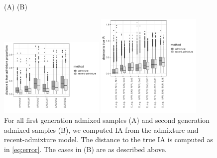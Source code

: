 \documentclass[12pt]{article}
\theoremstyle{definition}
\begin{document}
\begin{figure}[htb]
  \hspace{3cm} (A) \hspace{8cm} (B)
  \begin{center}
    \parbox[b]{0.45\textwidth}{\includegraphics[width=0.45\textwidth]{deviations_mixed.pdf}\vspace{2cm}}
    \hspace{1cm}
    \parbox[b]{0.45\textwidth}{\includegraphics[width=0.45\textwidth]{deviations_mixed_cases.pdf}}
  \end{center}
  \caption{\label{fig:mixed_cases} For all first generation admixed
    samples (A) and second generation admixed samples (B), we computed
    IA from the admixture and recent-admixture model. The distance to
    the true IA is computed as in \eqref{eq:error}. The cases in (B)
    are as described above.}
\end{figure}
\end{document}

